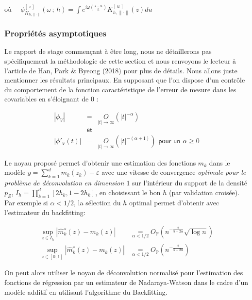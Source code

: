 où $\quad \phi_{K_{h, \lVert \cdot \rVert}}^{[\, z\, ]}( \omega \, ; \, h) = \int e^{i \omega \left(\frac{z-u}{h}\right)} K_{h, \lVert \cdot \rVert}^{[\, u \,]}(z) du$

\subsubsection{Propriétés asymptotiques}

Le rapport de stage commençant à être long, nous ne détaillerons pas spécifiquement la méthodologie de cette section et nous renvoyons le lecteur à l'article de Han, Park \& Byeong (2018) \cite{han2018smooth} pour plus de détails. Nous allons juste mentionner les résultats principaux. En supposant que l'on dispose d'un contrôle du comportement de la fonction caractéristique de l'erreur de mesure dans les covariables en s'éloignant de $0$ : 

\begin{equation}
    \begin{array}{rcl}
        |\phi_V| &=& \underset{|t| \rightarrow \infty} O(|t|^{-\alpha})
        \\
        &\textsf{et}&
        \\
        |\phi'_V(t)| &=& \underset{|t| \rightarrow \infty}{O}\left( |t|^{-(\alpha+1)} \right) \textsf{ pour un }\alpha \geq 0
    \end{array}
\end{equation}

\noindent Le noyau proposé permet d'obtenir une estimation des fonctions $m_k$ dans le modèle $y = \sum_{k=1}^d m_k(z_k) + \varepsilon$ avec une vitesse de convergence \emph{optimale pour le problème de déconvolution en dimension $1$} sur l'intérieur du support de la densité $p_Z$, $I_h = \prod_{k=1}^d[2h_k, 1 -2h_k]$, en choisissant le bon $h$ (par validation croisée). Par exemple si $\alpha < 1/2$, la sélection du $h$ optimal    permet d'obtenir avec l'estimateur du backfitting:

\begin{align}
    \sup_{z \in I_h} \left| \hat m^\star_k(z) - m_k(z) \right| &\underset{\alpha < 1/2}= O_{\mathds P} \left( n^{- \frac{2}{5 + 2 \alpha} }\sqrt{\log n} \right)
    \\
    \sup_{z \in [0,1]} \left| \hat m^\star_k(z) - m_k(z) \right| &\underset{\alpha < 1/2}= O_{\mathds P} \left( n^{- \frac{2}{5 + 2 \alpha} } \right)
\end{align}

\noindent On peut alors utiliser le noyau de déconvolution normalisé pour l'estimation des fonctions de régression par un estimateur de Nadaraya-Watson dans le cadre d'un modèle additif en utilisant l'algorithme du Backfitting. 